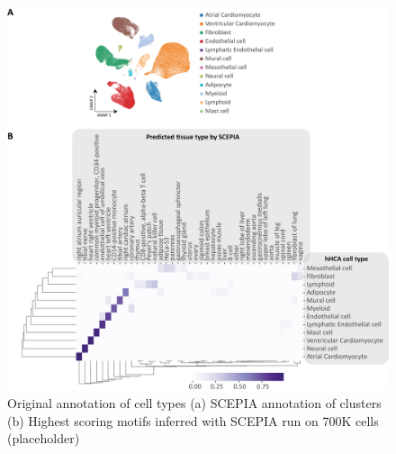 \begin{figure}
    \centering
    \includegraphics[width=\linewidth]{SCEPIA_Annotation_allCells_SuppFig1_v4.png}
    \caption{Original annotation of cell types (a) SCEPIA annotation of clusters (b) Highest scoring motifs inferred with SCEPIA run on 700K cells (placeholder) }
    \label{fig:scepia_hhca1}
\end{figure}

